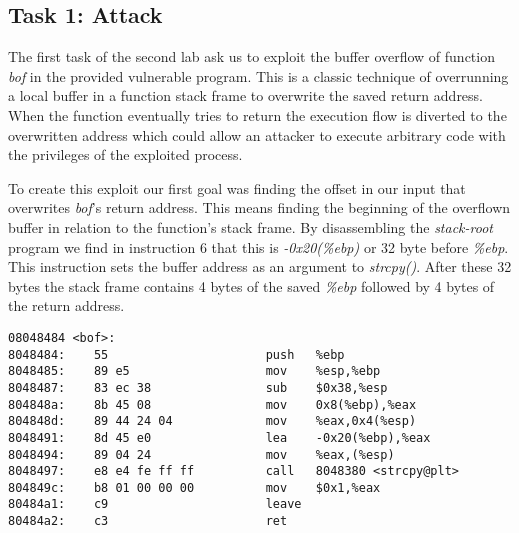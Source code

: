 



\subsection{Task 1: Attack}
The first task of the second lab ask us to exploit the buffer overflow of function \emph{bof} in the provided vulnerable program. This is a classic technique of overrunning a local buffer in a function stack frame to overwrite the saved return address. When the function eventually tries to return the execution flow is diverted to the overwritten address which could allow an attacker to execute arbitrary code with the privileges  of the exploited process.

To create this exploit our first goal was finding the offset in our input that overwrites \emph{bof}'s return address. This means finding the beginning of the overflown buffer in relation to the function's stack frame. By disassembling the \emph{stack-root} program we find in instruction 6 that this is \emph{-0x20(\%ebp)} or 32 byte before \emph{\%ebp}. This instruction sets the buffer address as an argument to \emph{strcpy()}. After these 32 bytes the stack frame contains 4 bytes of the saved \emph{\%ebp} followed by 4 bytes of the return address.

\begin{minipage}{\linewidth}
\begin{lstlisting}[caption={bof function disassembly},
frame=single]
08048484 <bof>:
8048484:	55                   	push   %ebp
8048485:	89 e5                	mov    %esp,%ebp
8048487:	83 ec 38             	sub    $0x38,%esp
804848a:	8b 45 08             	mov    0x8(%ebp),%eax
804848d:	89 44 24 04          	mov    %eax,0x4(%esp)
8048491:	8d 45 e0             	lea    -0x20(%ebp),%eax
8048494:	89 04 24             	mov    %eax,(%esp)
8048497:	e8 e4 fe ff ff       	call   8048380 <strcpy@plt>
804849c:	b8 01 00 00 00       	mov    $0x1,%eax
80484a1:	c9                   	leave
80484a2:	c3                   	ret
\end{lstlisting}
\end{minipage}

